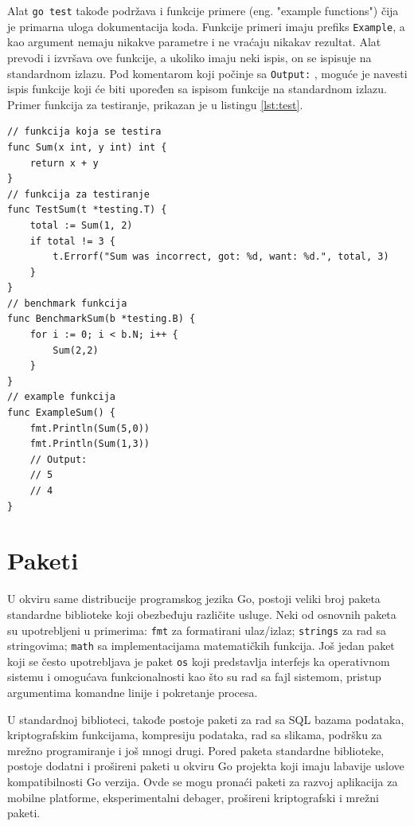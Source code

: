 \documentclass[12pt,oneside]{memoir}
\begin{document}
Alat \texttt{go test} takođe podržava i funkcije primere (eng. "example functions") čija je primarna uloga dokumentacija koda. Funkcije primeri imaju prefiks  \texttt{Example}, a kao argument nemaju nikakve parametre i ne vraćaju nikakav rezultat. Alat prevodi i izvršava ove funkcije, a ukoliko imaju neki ispis, on se ispisuje na standardnom izlazu. Pod komentarom koji počinje sa \texttt{Output:} , moguće je navesti ispis funkcije koji će biti upoređen sa ispisom funkcije na standardnom izlazu. Primer funkcija za testiranje, prikazan je u listingu \ref{lst:test}.

\begin{center}
\begin{lstlisting}[caption=Primer različitih tipova funkcija za testiranje, label={lst:test},  backgroundcolor=\color{background}]
// funkcija koja se testira
func Sum(x int, y int) int {  
	return x + y
}
// funkcija za testiranje
func TestSum(t *testing.T) {  
	total := Sum(1, 2)
	if total != 3 {
		t.Errorf("Sum was incorrect, got: %d, want: %d.", total, 3)
	}
}
// benchmark funkcija
func BenchmarkSum(b *testing.B) {
	for i := 0; i < b.N; i++ {
		Sum(2,2)
	}
}
// example funkcija
func ExampleSum() {
	fmt.Println(Sum(5,0))
	fmt.Println(Sum(1,3))
	// Output:
	// 5
	// 4
}

\end{lstlisting}
\end{center}

\section{Paketi}

U okviru same distribucije programskog jezika Go, postoji veliki broj paketa standardne biblioteke koji obezbeđuju različite usluge. Neki od osnovnih paketa su upotrebljeni u primerima: \texttt{fmt} za formatirani ulaz/izlaz; \texttt{strings} za rad sa stringovima; \texttt{math} sa implementacijama matematičkih funkcija. Još jedan paket koji se često upotrebljava je paket \texttt{os} koji predstavlja interfejs ka operativnom sistemu i omogućava funkcionalnosti kao što su rad sa fajl sistemom, pristup argumentima komandne linije i pokretanje procesa.

U standardnoj biblioteci, takođe postoje paketi za rad sa SQL bazama podataka, kriptografskim funkcijama, kompresiju podataka, rad sa slikama,  podršku za mrežno programiranje i još mnogi drugi. Pored paketa standardne biblioteke, postoje dodatni i prošireni paketi u okviru Go projekta koji imaju labavije uslove kompatibilnosti Go verzija. Ovde se mogu pronaći paketi za razvoj aplikacija za mobilne platforme, eksperimentalni debager, prošireni kriptografski i mrežni paketi. 
\end{document}
